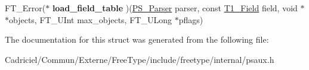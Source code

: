 \begin{DoxyCompactItemize}
\item 
\hypertarget{struct_p_s___parser___funcs_rec___ac925f8b8b583c22717da0475a2427863}{F\-T\-\_\-\-Error($\ast$ {\bfseries load\-\_\-field\-\_\-table} )(\hyperlink{struct_p_s___parser_rec__}{P\-S\-\_\-\-Parser} parser, const \hyperlink{struct_t1___field_rec__}{T1\-\_\-\-Field} field, void $\ast$$\ast$objects, F\-T\-\_\-\-U\-Int max\-\_\-objects, F\-T\-\_\-\-U\-Long $\ast$pflags)}\label{struct_p_s___parser___funcs_rec___ac925f8b8b583c22717da0475a2427863}

\end{DoxyCompactItemize}


The documentation for this struct was generated from the following file\-:\begin{DoxyCompactItemize}
\item 
Cadriciel/\-Commun/\-Externe/\-Free\-Type/include/freetype/internal/psaux.\-h\end{DoxyCompactItemize}
